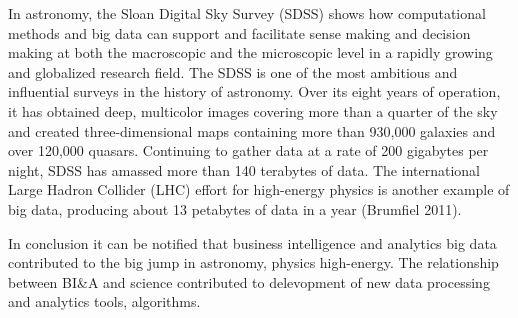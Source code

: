 In astronomy, the Sloan Digital Sky Survey (SDSS) shows
how computational methods and big data can support and
facilitate sense making and decision making at both the
macroscopic and the microscopic level in a rapidly growing
and globalized research field. The SDSS is one of the most
ambitious and influential surveys in the history of astronomy.
Over its eight years of operation, it has obtained deep, multicolor
images covering more than a quarter of the sky and
created three-dimensional maps containing more than 930,000
galaxies and over 120,000 quasars. Continuing to gather data
at a rate of 200 gigabytes per night, SDSS has amassed more
than 140 terabytes of data. The international Large Hadron
Collider (LHC) effort for high-energy physics is another
example of big data, producing about 13 petabytes of data in
a year (Brumfiel 2011).

In conclusion it can be notified that business intelligence and analytics big data contributed to the big jump in astronomy, physics  high-energy. The relationship between BI\&A and science contributed to delevopment of new data processing and analytics tools, algorithms.